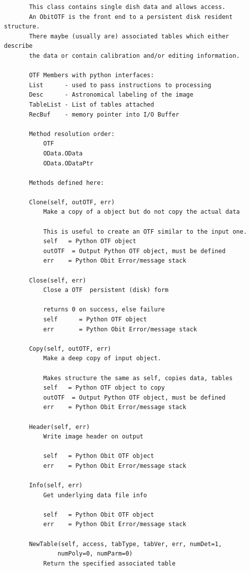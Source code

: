 \documentclass[11pt]{report}
\begin{document}
\begin{verbatim}
       This class contains single dish data and allows access.
       An ObitOTF is the front end to a persistent disk resident structure.
       There maybe (usually are) associated tables which either describe
       the data or contain calibration and/or editing information.
       
       OTF Members with python interfaces:
       List      - used to pass instructions to processing
       Desc      - Astronomical labeling of the image 
       TableList - List of tables attached
       RecBuf    - memory pointer into I/O Buffer
       
       Method resolution order:
           OTF
           OData.OData
           OData.ODataPtr
       
       Methods defined here:
       
       Clone(self, outOTF, err)
           Make a copy of a object but do not copy the actual data
           
           This is useful to create an OTF similar to the input one.
           self   = Python OTF object
           outOTF  = Output Python OTF object, must be defined
           err    = Python Obit Error/message stack
       
       Close(self, err)
           Close a OTF  persistent (disk) form
           
           returns 0 on success, else failure
           self      = Python OTF object
           err       = Python Obit Error/message stack
       
       Copy(self, outOTF, err)
           Make a deep copy of input object.
           
           Makes structure the same as self, copies data, tables
           self   = Python OTF object to copy
           outOTF  = Output Python OTF object, must be defined
           err    = Python Obit Error/message stack
       
       Header(self, err)
           Write image header on output
           
           self   = Python Obit OTF object
           err    = Python Obit Error/message stack
       
       Info(self, err)
           Get underlying data file info
           
           self   = Python Obit OTF object
           err    = Python Obit Error/message stack
       
       NewTable(self, access, tabType, tabVer, err, numDet=1, 
               numPoly=0, numParm=0)
           Return the specified associated table
           

\end{verbatim}
\end{document}
